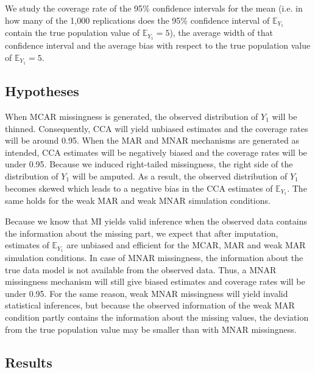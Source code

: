 \documentclass[11pt,a4paper]{article}
\begin{document}
We study the coverage rate of the 95\% confidence intervals for the mean (i.e. in how many of the 1,000 replications does the 95\% confidence interval of $\mathbb{E}_{Y_1}$ contain the true population value of $\mathbb{E}_{Y_1} = 5$), the average width of that confidence interval and the average bias with respect to the true population value of $\mathbb{E}_{Y_1} = 5$. 

\subsection{\normalsize Hypotheses}\label{hypotheses}

When MCAR missingness is generated, the observed distribution of $Y_1$ will be thinned. Consequently, CCA will yield unbiased estimates and the coverage rates will be around 0.95. When the MAR and MNAR mechanisms are generated as intended, CCA estimates will be negatively biased and the coverage rates will be under 0.95. Because we induced right-tailed missingness, the right side of the distribution of $Y_1$ will be amputed. As a result, the observed distribution of $Y_1$ becomes skewed which leads to a negative bias in the CCA estimates of $\mathbb{E}_{Y_1}$. The same holds for the weak MAR and weak MNAR simulation conditions. 

Because we know that MI yields valid inference when the observed data contains the information about the missing part, we expect that after imputation, estimates of $\mathbb{E}_{Y_1}$ are unbiased and efficient for the MCAR, MAR and weak MAR simulation conditions. In case of MNAR missingness, the information about the true data model is not available from the observed data. Thus, a MNAR missingness mechanism will still give biased estimates and coverage rates will be under 0.95. For the same reason, weak MNAR missingness will yield invalid statistical inferences, but because the observed information of the weak MAR condition partly contains the information about the missing values, the deviation from the true population value may be smaller than with MNAR missingness. 

\subsection{Results}
\end{document}
